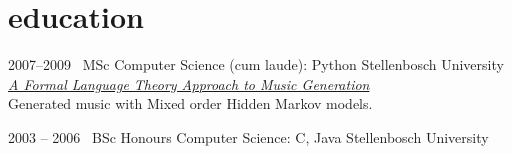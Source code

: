 \documentclass[print]{friggeri-cv-a4} %
\begin{document}
\section{education}

\begin{entrylist}


\entry
{2007--2009}
{\faMusic\ MSc {\normalfont Computer Science} (cum laude): {\normalfont Python}}
{Stellenbosch University}
{\href{http://superwillow.sourceforge.net/}{\emph{A Formal Language Theory Approach to Music Generation}} \\ Generated music with Mixed order Hidden Markov models.}

\entry
{2003 -- 2006}
{\faGraduationCap\ BSc Honours {\normalfont Computer Science: C, Java}}
{Stellenbosch University}
{}

\end{entrylist}
\end{document}
